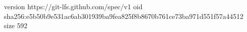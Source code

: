 version https://git-lfs.github.com/spec/v1
oid sha256:e5b50b9e531ac6ab301939ba9fea825f8b8670b761ce73ba971d551f57a44512
size 592
